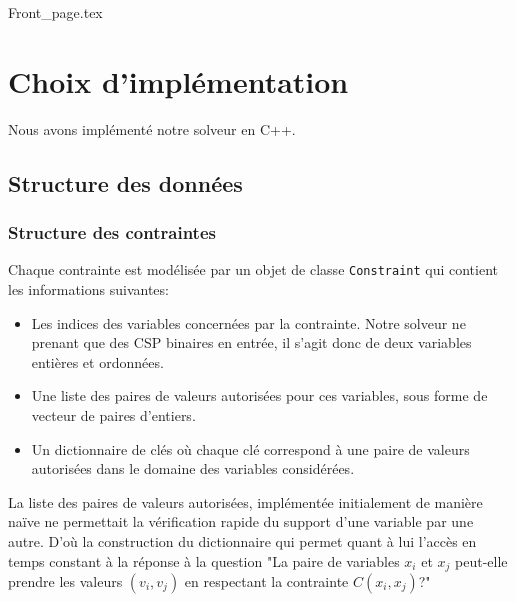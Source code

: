 \documentclass[14pt]{article}
\begin{document}
\renewcommand{\footrulewidth}{0.4pt}
\renewcommand{\headrulewidth}{0.4pt}

\vspace{0cm}              %


{Front_page.tex}

\clearpage
\thispagestyle{fancy}
\tableofcontents
\thispagestyle{fancy}      %

\clearpage

\section{Choix d'implémentation}

Nous avons implémenté notre solveur en C++.

\subsection{Structure des données}

\subsubsection{Structure des contraintes} \label{Structure des contraintes}
Chaque contrainte est modélisée par un objet de classe \texttt{Constraint} qui contient les informations suivantes:
\begin{itemize}
	\item Les indices des variables concernées par la contrainte. Notre solveur ne prenant que des CSP binaires en entrée, il s'agit donc de deux variables entières et ordonnées.
	\item Une liste des paires de valeurs autorisées pour ces variables, sous forme de vecteur de paires d'entiers.
	\item Un dictionnaire de clés où chaque clé correspond à une paire de valeurs autorisées dans le domaine des variables considérées.
\end{itemize}

La liste des paires de valeurs autorisées, implémentée initialement de manière naïve ne permettait la vérification rapide du support d'une variable par une autre. D'où la construction du dictionnaire qui permet quant à lui l'accès en temps constant à la réponse à la question "La paire de variables $x_i$ et $x_j$ peut-elle prendre les valeurs $(v_i,v_j)$ en respectant la contrainte $C(x_i,x_j)$?"
\end{document}
